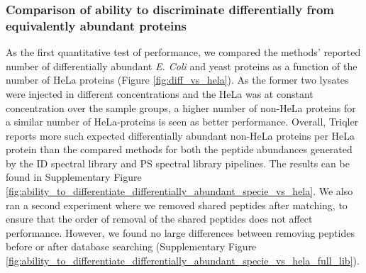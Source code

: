 \documentclass[10pt,letterpaper]{article}
\begin{document}
\subsubsection*{Comparison of ability to discriminate differentially from equivalently abundant proteins}

As the first quantitative test of performance, we compared the methods' reported number of differentially abundant {\em E. Coli} and yeast proteins as a function of the number of HeLa proteins (Figure \ref{fig:diff_vs_hela}). As the former two lysates were injected in different concentrations and the HeLa was at constant concentration over the sample groups, a higher number of non-HeLa proteins for a similar number of HeLa-proteins is seen as better performance.  Overall, Triqler reports more such expected differentially abundant non-HeLa proteins per HeLa protein than the compared methods for both the peptide abundances generated by the ID spectral library and PS spectral library pipelines. The results can be found in Supplementary Figure \ref{fig:ability_to_differentiate_differentially_abundant_specie_vs_hela}. We also ran a second experiment where we removed shared peptides after matching, to ensure that the order of removal of the shared peptides does not affect performance. However, we found no large differences between removing peptides before or after database searching (Supplementary Figure \ref{fig:ability_to_differentiate_differentially_abundant_specie_vs_hela_full_lib}).
\end{document}
